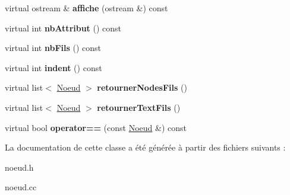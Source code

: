 \begin{DoxyCompactItemize}
\item 
\hypertarget{classNoeud_a6780e6e2b0a251ba12cca49432043bd7}{
virtual ostream \& {\bfseries affiche} (ostream \&) const }
\label{classNoeud_a6780e6e2b0a251ba12cca49432043bd7}

\item 
\hypertarget{classNoeud_a95995d7149eca40b82a5af09fd34e30e}{
virtual int {\bfseries nbAttribut} () const }
\label{classNoeud_a95995d7149eca40b82a5af09fd34e30e}

\item 
\hypertarget{classNoeud_a4e7c9b2370e3cb38eb17d76242ea61ef}{
virtual int {\bfseries nbFils} () const }
\label{classNoeud_a4e7c9b2370e3cb38eb17d76242ea61ef}

\item 
\hypertarget{classNoeud_a99a1ea747bffbb71d1e503b6c7ab7a2d}{
virtual int {\bfseries indent} () const }
\label{classNoeud_a99a1ea747bffbb71d1e503b6c7ab7a2d}

\item 
\hypertarget{classNoeud_a35d193d8ac74ec15781500a7efcf2401}{
virtual list$<$ \hyperlink{classNoeud}{Noeud} $>$ {\bfseries retournerNodesFils} ()}
\label{classNoeud_a35d193d8ac74ec15781500a7efcf2401}

\item 
\hypertarget{classNoeud_a9cff8c418007ae84f96eff320fa5e673}{
virtual list$<$ \hyperlink{classNoeud}{Noeud} $>$ {\bfseries retournerTextFils} ()}
\label{classNoeud_a9cff8c418007ae84f96eff320fa5e673}

\item 
\hypertarget{classNoeud_a5cb2e3351e1e4f73e183c759a6eb3fd1}{
virtual bool {\bfseries operator==} (const \hyperlink{classNoeud}{Noeud} \&) const }
\label{classNoeud_a5cb2e3351e1e4f73e183c759a6eb3fd1}

\end{DoxyCompactItemize}


La documentation de cette classe a été générée à partir des fichiers suivants :\begin{DoxyCompactItemize}
\item 
noeud.h\item 
noeud.cc\end{DoxyCompactItemize}
